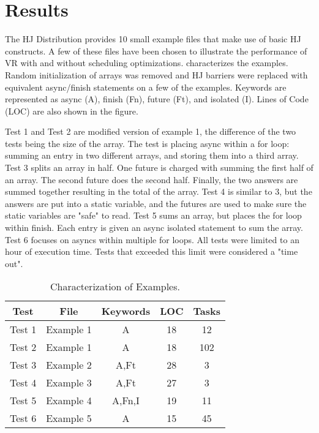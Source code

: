 \section{Results}
The HJ Distribution provides 10 small example files that make use of basic HJ constructs. A few of these files have been chosen to illustrate the performance of VR with and without scheduling optimizations.  characterizes the examples. Random initialization of arrays was removed and HJ barriers were replaced with equivalent async/finish statements on a few of the examples. Keywords are represented as async (A), finish (Fn), future (Ft), and isolated (I). Lines of Code (LOC) are also shown in the figure.

Test 1 and Test 2 are modified version of example 1, the difference of the two tests being the size of the array. The test is placing async within a for loop: summing an entry in two different arrays, and storing them into a third array. Test 3 splits an array in half. One future is charged with summing the first half of an array. The second future does the second half. Finally, the two answers are summed together resulting in the total of the array. Test 4 is similar to 3, but the answers are put into a static variable, and the futures are used to make sure the static variables are "safe" to read. Test 5 sums an array, but places the for loop within finish. Each entry is given an async isolated statement to sum the array. Test 6 focuses on asyncs within multiple for loops. All tests were limited to an hour of execution time. Tests that exceeded this limit were considered a "time out".

\begin{table}
\caption{Characterization of Examples.}
\begin{center}
\begin{tabular}{|c||c|c|c|c|}
\hline
Test & File & Keywords & LOC & Tasks \\
\hline
\hline
Test 1 & Example 1 & A & 18 & 12 \\
Test 2 & Example 1 & A & 18 & 102\\
Test 3 & Example 2 & A,Ft & 28 & 3\\
Test 4 & Example 3 & A,Ft & 27 & 3\\
Test 5 & Example 4 & A,Fn,I & 19 & 11\\
Test 6 & Example 5 & A & 15 & 45\\
\hline
\end{tabular} 
\end{center}
\label{tab:char}
\end{table}

